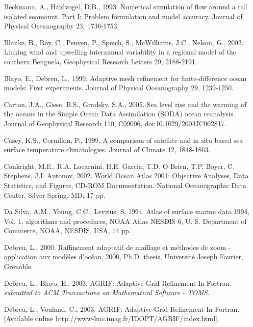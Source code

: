 Beckmann, A., Haidvogel, D.B.,
1993.
Numerical simulation of flow around a tall
isolated seamount. Part I: Problem formulation
and model accuracy.
Journal of Physical Oceanography
23,
1736-1753.

Blanke, B., Roy, C., Penven, P., Speich, S., 
McWilliams, J.C., Nelson, G.,
2002.
Linking wind and upwelling interannual variability in a
regional model of the southern Benguela,
Geophysical Research Letters
29,
2188-2191.

Blayo, E., Debreu, L.,
1999.
Adaptive mesh refinement for finite-difference
ocean models: First experiments.
Journal of Physical Oceanography
29,
1239-1250.

Carton, J.A., Giese, B.S., Grodsky, S.A., 2005. 
Sea level rise and the warming of the oceans in the 
{Simple Ocean Data Assimilation (SODA)} ocean reanalysis.
Journal of Geophysical Research
110, {C}09006, doi:10.1029/2004{JC}002817.

Casey, K.S., Cornillon, P., 1999. 
A comparison of satellite and in situ based
sea surface temperature climatologies. 
Journal of Climate 
12, 1848-1863.

Conkright, M.E., R.A. Locarnini, H.E. Garcia, T.D. O Brien, 
T.P. Boyer, C. Stephens, J.I. Antonov, 2002. 
World Ocean Atlas 2001: Objective Analyses, Data Statistics, 
and Figures, CD-ROM Documentation. 
National Oceanographic Data Center, 
Silver Spring, MD, 
17 pp.

Da Silva, A.M., Young, C.C., Levitus, S.
1994.
Atlas of surface marine data 1994,
Vol. 1,
algorithms and procedures,
NOAA Atlas NESDIS 6,
U. S. Department of Commerce,
NOAA,
NESDIS,
USA,
74 pp.

Debreu, L.,
2000.
Raffinement adaptatif de maillage et m\'ethodes de zoom -
application aux mod\`eles d'oc\'ean,
2000,
Ph.D. thesis,
Universit\'e Joseph Fourier,
Grenoble.

Debreu, L., Blayo, E.,
2003.
AGRIF: Adaptive Grid Refinement In Fortran.
{\it submitted to ACM Transactions on Mathematical Software - TOMS}.

Debreu, L., Vouland, C.,
2003.
AGRIF: Adaptive Grid Refinement In Fortran.
[Available online http://www-lmc.imag.fr/IDOPT/AGRIF/index.html].

